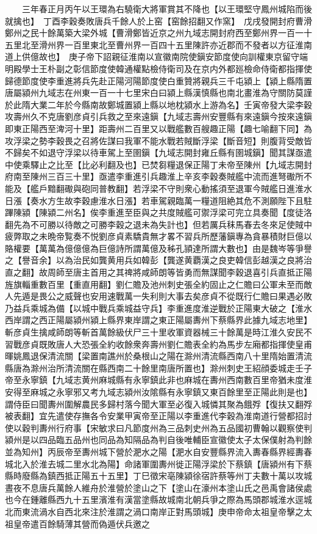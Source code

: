 　　三年春正月丙午以王環為右驍衛大將軍賞其不降也【以王環堅守鳳州城陷而後就擒也】　丁酉李穀奏敗唐兵千餘人於上窑【窑餘招翻又作窯】　戊戌發開封府曹滑鄭州之民十餘萬築大梁外城【曹滑鄭皆近京之州九域志開封府西至鄭州界一百一十五里北至滑州界一百里東北至曹州界一百四十五里陳許亦近郡而不發者以方征淮南道上供億故也】　庚子帝下詔親征淮南以宣徽南院使鎭安節度使向訓權東京留守端明殿學士王朴副之彰信節度使韓通權點檢侍衛司及在京内外都廵檢命侍衛都指揮使歸德節度使李重進將兵先赴正陽河陽節度使白重贊將親兵三千屯潁上【潁上縣隋置唐屬潁州九域志在州東一百一十七里宋白曰潁上縣漢慎縣也南北畫淮為守關防莫謹於此隋大業二年於今縣南故鄭城置潁上縣以地枕潁水上游為名】壬寅帝發大梁李穀攻壽州久不克唐劉彦貞引兵救之至來遠鎭【九域志壽州安豐縣有來遠鎭今按來遠鎭即東正陽西至渒河十里】距壽州二百里又以戰艦數百艘趣正陽【趣七喻翻下同】為攻浮梁之勢李穀畏之召將佐謀曰我軍不能水戰若賊斷浮梁【斷音短】則腹背受敵皆不歸矣不如退守浮梁以待車駕上至圉鎭【九域志開封雍丘縣有圉城鎭】聞其謀亟遣中使乘驛止之比至【比必利翻及也】已焚芻糧退保正陽丁未帝至陳州【九域志開封府南至陳州三百三十里】亟遣李重進引兵趣淮上辛亥李穀奏賊艦中流而進弩礮所不能及【艦戶黯翻礮與砲同普教翻】若浮梁不守則衆心動搖須至退軍今賊艦日進淮水日漲【奏水方生故李穀慮淮水日漲】若車駕親臨萬一糧道阻絶其危不測願陛下且駐蹕陳潁【陳潁二州名】俟李重進至臣與之共度賊艦可禦浮梁可完立具奏聞【度徒洛翻先為不可勝以待敵之可勝李穀之退未為失計也】但若厲兵秣馬春去冬來足使賊中疲弊取之未晩帝覧奏不悦劉彦貞素驕貴無才畧不習兵所歷藩鎭專為貪暴積財巨億以賂權要【萬萬為億億億為巨億詩所謂萬億及秭孔頴達所謂大數也】由是魏岑等爭譽之【譽音余】以為治民如龔黄用兵如韓彭【龔遂黄覇漢之良吏韓信彭越漢之良將治直之翻】故周師至唐主首用之其禆將咸師朗等皆勇而無謀聞李穀退喜引兵直抵正陽旌旗輜重數百里【重直用翻】劉仁贍及池州刺史張全約固止之仁贍曰公軍未至而敵人先遁是畏公之威聲也安用速戰萬一失利則大事去矣彦貞不從既行仁贍曰果遇必敗乃益兵乘城為備【以城中戰兵乘城益守兵】李重進度淮逆戰於正陽東大破之【淮水西岸謂之西正陽屬潁州潁上縣界東岸謂之東正陽屬夀州下蔡縣界此據九域志地里】斬彦貞生擒咸師朗等斬首萬餘級伏尸三十里收軍資器械三十餘萬是時江淮久安民不習戰彦貞既敗唐人大恐張全約收餘衆奔壽州劉仁贍表全約為馬步左廂都指揮使皇甫暉姚鳳退保清流關【梁置南譙州於桑根山之陽在滁州清流縣西南八十里隋始置清流縣唐為滁州治所清流關在縣西南二十餘里南唐所置也】滁州刺史王紹顔委城走壬子帝至永寧鎮【九域志黄州麻城縣有永寧鎮此非也麻城在夀州西南數百里帝猶未度淮安得至麻城之永寧邪又考九域志潁州汝隂縣有永寧鎮又東百餘里至正陽此則是也】謂侍臣曰聞夀州圍解農民多歸村落今聞大軍至必復入城憐其聚為餓殍【復扶又翻殍被表翻】宜先遣使存撫各令安業甲寅帝至正陽以李重進代李穀為淮南道行營都招討使以穀判夀州行府事【宋敏求曰凡節度州為三品刺史州為五品國初曹翰以觀察使判潁州是以四品臨五品州也同品為知隔品為判自後唯輔臣宣徽使太子太保僕射為判餘並為知州】丙辰帝至夀州城下營於淝水之陽【淝水自安豐縣界流入夀春縣界經夀春城北入於淮去城二里水北為陽】命諸軍圍夀州徙正陽浮梁於下蔡鎮【唐潁州有下蔡縣時廢縣為鎮西抵正陽五十五里】丁巳徵宋亳陳潁徐宿許蔡等州丁夫數十萬以攻城晝夜不息唐兵萬餘人維舟於淮營於塗山之下【塗山在濠州本塗山氏之邑禹會諸侯處也今在鍾離縣西九十五里濱淮有漢當塗縣故城南北朝兵爭之際為馬頭郡城淮水逕城北而東流渦水自西北來注於淮謂之渦口南岸正對馬頭城】庚申帝命太祖皇帝擊之太祖皇帝遣百餘騎薄其營而偽遁伏兵邀之

